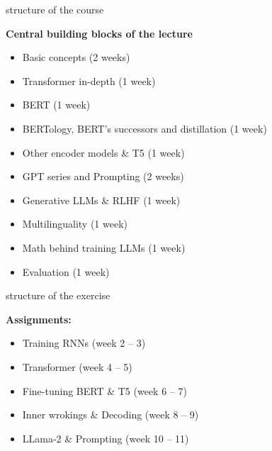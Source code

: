 \begin{vbframe}{structure of the course}

\vfill

\textbf{Central building blocks of the lecture}

	\begin{itemize}
		\item Basic concepts (2 weeks)
		\item Transformer in-depth (1 week)
		\item BERT (1 week)
		\item BERTology, BERT's successors and distillation (1 week)
		\item Other encoder models \& T5 (1 week)
		\item GPT series and Prompting (2 weeks)
		\item Generative LLMs \& RLHF (1 week)
		\item Multilinguality (1 week)
		\item Math behind training LLMs (1 week)
		\item Evaluation (1 week)
	\end{itemize}

\vfill

\end{vbframe}


\begin{vbframe}{structure of the exercise}

\vfill

\textbf{Assignments:}

	\begin{itemize}
		\item Training RNNs (week 2 -- 3)
		\item Transformer (week 4 -- 5)
		\item Fine-tuning BERT \& T5 (week 6 -- 7)
		\item Inner wrokings \& Decoding (week 8 -- 9)
		\item LLama-2 \& Prompting (week 10 -- 11)
	\end{itemize}

\vfill

\end{vbframe}


